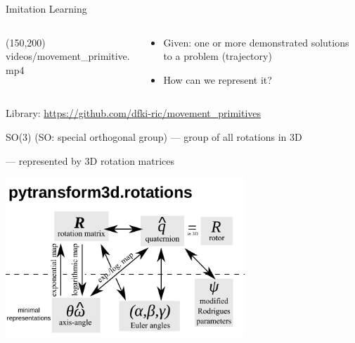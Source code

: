 \documentclass[14pt]{beamer}
\begin{document}
\begin{frame}[fragile]{Imitation Learning}
\begin{columns}
\begin{column}{0.4\textwidth}
\makebox(150,200){
{videos/movement_primitive.mp4}}
\end{column}
\begin{column}{0.6\textwidth}
\begin{itemize}
\item Given: one or more demonstrated solutions to a problem (trajectory)
\item How can we represent it?
\end{itemize}
\end{column}
\end{columns}
{\footnotesize Library:
\url{https://github.com/dfki-ric/movement_primitives}}
\end{frame}

\begin{frame}{SO(3) (SO: special orthogonal group)}
--- group of all rotations in 3D

--- represented by 3D rotation matrices

\vfill

\begin{center}
\includegraphics[width=9cm]{images/rotations}
\end{center}
\end{frame}
\end{document}

